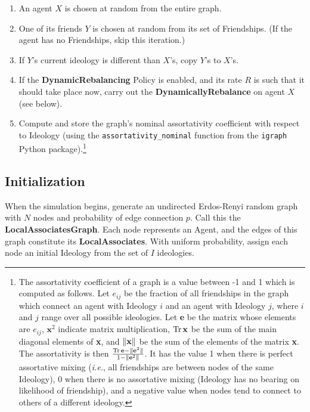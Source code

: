 \begin{enumerate}
\itemsep.1em
\item An agent $X$ is chosen at random from the entire graph.
\item One of its friends $Y$ is chosen at random from its set of Friendships.
(If the agent has no Friendships, skip this iteration.)
\item If $Y$'s current ideology is different than $X$'s, copy $Y$'s to $X$'s.
\item If the \textbf{DynamicRebalancing} Policy is enabled, and its rate $R$
is such that it should take place now, carry out the
\textbf{DynamicallyRebalance} on agent $X$ (see below).
 
\item Compute and store the graph's nominal assortativity coefficient with
respect to Ideology (using the \texttt{assortativity\_nominal} function from
the \texttt{igraph} Python package\cite{csardi_igraph_2006}).\footnote{The
assortativity coefficient of a graph is a value between -1 and 1 which is
computed as follows. Let $e_{ij}$ be the fraction of all friendships in the
graph which connect an agent with Ideology $i$ and an agent with Ideology $j$,
where $i$ and $j$ range over all possible ideologies. Let \textbf{e} be the
matrix whose elements are $e_{ij}$, $\textbf{x}^2$ indicate matrix
multiplication, $\operatorname{Tr} \textbf{x}$ be the sum of the main diagonal elements of
\textbf{x}, and $\lVert\textbf{x}\rVert$ be the sum of the elements of the matrix
\textbf{x}. The assortativity is then $\frac{\operatorname{Tr} \textbf{e} -
\lVert\textbf{e}^2\rVert}{1 - \lVert\textbf{e}^2\rVert}$. It has the value 1 when there
is perfect assortative mixing (\textit{i.e.}, all friendships are between
nodes of the same Ideology), 0 when there is no assortative mixing (Ideology
has no bearing on likelihood of friendship), and a negative value when nodes
tend to connect to others of a different ideology.}

\end{enumerate}


\subsection{Initialization}
\label{sec:initialization}

When the simulation begins, generate an undirected Erdos-Renyi random
graph\cite{erdos_evolution_1960} with $N$ nodes and probability of edge
connection $p$. Call this the \textbf{LocalAssociatesGraph}. Each node
represents an Agent, and the edges of this graph constitute its
\textbf{LocalAssociates}. With uniform probability, assign each node an
initial Ideology from the set of $I$ ideologies.

